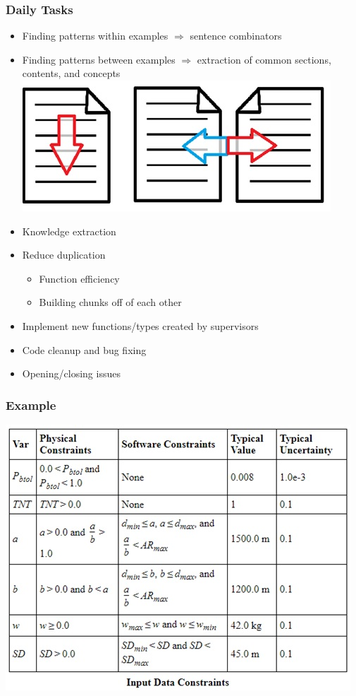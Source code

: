\documentclass{beamer}
\begin{document}
\begin{frame}
\frametitle{Daily Tasks}
\begin{itemize}
 \item<1-> Finding patterns within examples $\Rightarrow$ sentence combinators
 \item<1-> Finding patterns between examples $\Rightarrow$ extraction of common sections, contents, and concepts
 \includegraphics[scale=0.70]{../WG2_11/WinAndBwExamples.jpg}
 \item<2-> Knowledge extraction
 \item<2-> Reduce duplication
  \begin{itemize}
   \item Function efficiency
   \item Building chunks off of each other
  \end{itemize}
 \item<3-> Implement new functions/types created by supervisors
 \item<4-> Code cleanup and bug fixing
 \item<5-> Opening/closing issues
\end{itemize}
\end{frame}

\begin{frame}
\frametitle{Example}
\includegraphics[scale=0.70]{InDataConsEx.jpg}
\end{frame}
\end{document}
